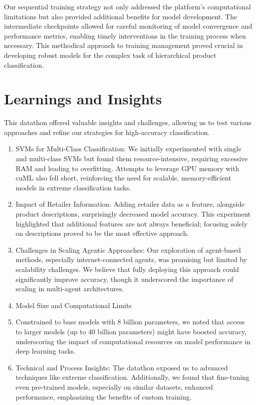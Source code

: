 \documentclass[9pt,a4paper,twoside]{rho-class/rho}
\begin{document}
    Our sequential training strategy not only addressed the platform's computational limitations but also provided additional benefits for model development. The intermediate checkpoints allowed for careful monitoring of model convergence and performance metrics, enabling timely interventions in the training process when necessary. This methodical approach to training management proved crucial in developing robust models for the complex task of hierarchical product classification.

\section{Learnings and Insights}

This datathon offered valuable insights and challenges, allowing us to test various approaches and refine our strategies for high-accuracy classification.

\begin{enumerate}
    \item SVMs for Multi-Class Classification: 
    We initially experimented with single and multi-class SVMs but found them resource-intensive, requiring excessive RAM and leading to overfitting. Attempts to leverage GPU memory with cuML also fell short, reinforcing the need for scalable, memory-efficient models in extreme classification tasks.

    \item Impact of Retailer Information: 
    Adding retailer data as a feature, alongside product descriptions, surprisingly decreased model accuracy. This experiment highlighted that additional features are not always beneficial; focusing solely on descriptions proved to be the most effective approach.

    \item Challenges in Scaling Agentic Approaches: 
    Our exploration of agent-based methods, especially internet-connected agents, was promising but limited by scalability challenges. We believe that fully deploying this approach could significantly improve accuracy, though it underscored the importance of scaling in multi-agent architectures.

    \item Model Size and Computational Limits
    \item Constrained to base models with 8 billion parameters, we noted that access to larger models (up to 40 billion parameters) might have boosted accuracy, underscoring the impact of computational resources on model performance in deep learning tasks.
    
    \item Technical and Process Insights: 
    The datathon exposed us to advanced techniques like extreme classification. Additionally, we found that fine-tuning even pre-trained models, especially on similar datasets, enhanced performance, emphasizing the benefits of custom training.

\end{enumerate}
\end{document}
